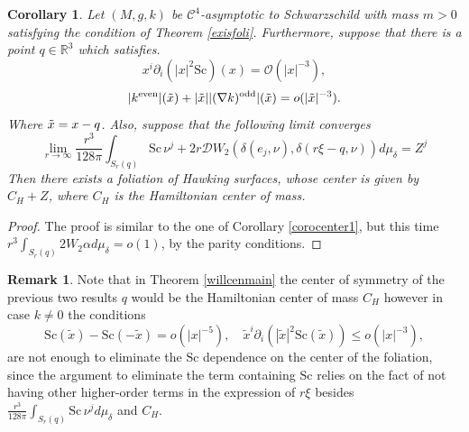 \documentclass[12pt,a4paper]{amsart}
\theoremstyle{plain}
\newtheorem{corollary}[theorem]{Corollary}
\theoremstyle{definition}
\newtheorem{remark}[theorem]{Remark}
\begin{document}
\begin{corollary}\label{corocenter2}
     Let $(M,g,k)$ be $ \mathcal{C}^4$-asymptotic to Schwarzschild with mass $m>0$ satisfying the condition of Theorem \ref{exisfoli}. Furthermore,  suppose that there is a point  $q \in \mathbb{R}^3$ which satisfies. 
\begin{equation}\label{strongdec2}
     x^i \partial_i (| x|^2 \mathrm{Sc})(x) = \mathcal{O}( | x|^{-3}),
\end{equation}
\begin{equation}
    |k^{\text{even}}|(\Tilde{x}) + |\Tilde{x}||(\nabla k)^{\text{odd}}|(\Tilde{x}) = o(|\Tilde{x}|^{-3}).
\end{equation}
Where $ \Tilde{x}= x-q$. Also, suppose that the following limit converges  
\begin{equation}
    \lim_{r \to \infty}\frac{r^3}{128 \pi} \int_{S_r(q)} \mathrm{Sc} \, \nu^j +   2r \mathcal{D}W_2\left( \delta( e_j, \nu ),  \delta( r\xi-q, \nu ) \right) d\mu_{\delta}  = Z^j
\end{equation}
Then there exists a foliation of Hawking surfaces, whose  center is given by $C_H+Z$, where $C_H$ is the Hamiltonian center of mass. 
\end{corollary}
\begin{proof}
    The proof is similar to the one of Corollary \ref{corocenter1}, but this time $  r^3 \int_{S_{r}(q)}   2 W_2 \alpha d\mu_\delta =o(1)$, by the parity conditions.
\end{proof}
\begin{remark}
Note that in Theorem \ref{willcenmain} the center of symmetry of the previous two results $q$ would be the Hamiltonian center of mass $C_H$ however in case $k\neq 0$  the conditions 
    \begin{equation}
    \mathrm{Sc}(\tilde{x}) - \mathrm{Sc}(-\tilde{x}) = o(|x|^{-5}), \quad
  \tilde{x}^i \partial_i(|\tilde{x}|^2 \mathrm{Sc} (\tilde{x})) \leq o(|x|^{-3}),  
\end{equation}
are not enough to eliminate the $\mathrm{Sc} $ dependence on the center of the foliation, since the argument to eliminate the term containing $\mathrm{Sc} $ relies on the fact of not having other higher-order terms in the expression of $r \xi$ besides $\frac{r^3}{128 \pi} \int_{S_r(q)} \mathrm{Sc} \, \nu^j d\mu_{\delta}$ and $C_H$.
\end{remark}
\end{document}
